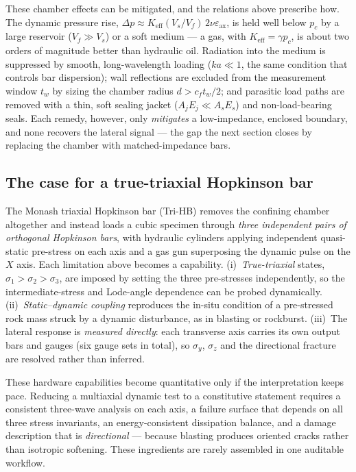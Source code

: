 \documentclass[11pt]{article}
\begin{document}
These chamber effects can be mitigated, and the relations above prescribe how.
The dynamic pressure rise, $\Delta p\approx K_{\mathrm{eff}}(V_s/V_f)\,2\nu\varepsilon_{\mathrm{ax}}$,
is held well below $p_c$ by a large reservoir ($V_f\gg V_s$) or a soft medium ---
a gas, with $K_{\mathrm{eff}}=\gamma p_c$, is about two orders of magnitude better
than hydraulic oil. Radiation into the medium is suppressed by smooth, long-wavelength
loading ($ka\ll1$, the same condition that controls bar dispersion); wall
reflections are excluded from the measurement window $t_w$ by sizing the chamber
radius $d>c_f t_w/2$; and parasitic load paths are removed with a thin, soft
sealing jacket ($A_jE_j\ll A_sE_s$) and non-load-bearing seals. Each remedy,
however, only \emph{mitigates} a low-impedance, enclosed boundary, and none
recovers the lateral signal --- the gap the next section closes by replacing the
chamber with matched-impedance bars.

\subsection{The case for a true-triaxial Hopkinson bar}

The Monash triaxial Hopkinson bar (Tri-HB) removes the confining chamber
altogether and instead loads a cubic specimen through \emph{three independent
pairs of orthogonal Hopkinson bars}, with hydraulic cylinders applying
independent quasi-static pre-stress on each axis and a gas gun superposing the
dynamic pulse on the $X$ axis. Each limitation above becomes a capability.
(i)~\emph{True-triaxial} states, $\sigma_1>\sigma_2>\sigma_3$, are imposed by
setting the three pre-stresses independently, so the intermediate-stress and
Lode-angle dependence can be probed dynamically. (ii)~\emph{Static--dynamic
coupling} reproduces the in-situ condition of a pre-stressed rock mass struck by a
dynamic disturbance, as in blasting or rockburst. (iii)~The lateral response is
\emph{measured directly}: each transverse axis carries its own output bars and
gauges (six gauge sets in total), so $\sigma_y$, $\sigma_z$ and the directional
fracture are resolved rather than inferred.

These hardware capabilities become quantitative only if the interpretation keeps
pace. Reducing a multiaxial dynamic test to a constitutive statement requires a
consistent three-wave analysis on each axis, a failure surface that depends on all
three stress invariants, an energy-consistent dissipation balance, and a
damage description that is \emph{directional} --- because blasting produces
oriented cracks rather than isotropic softening. These ingredients are rarely
assembled in one auditable workflow.
\end{document}
